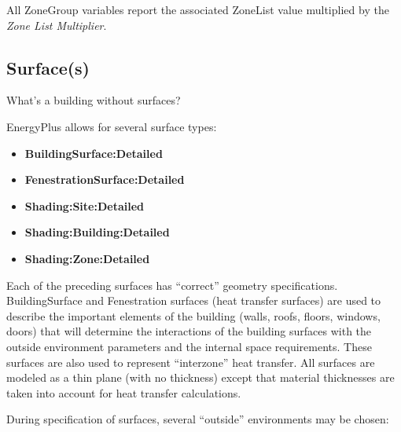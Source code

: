 All ZoneGroup variables report the associated ZoneList value multiplied by the \emph{Zone List Multiplier}.

\subsection{Surface(s)}\label{surfaces}

What's a building without surfaces?

EnergyPlus allows for several surface types:

\begin{itemize}
\item
  \textbf{BuildingSurface:Detailed}
\item
  \textbf{FenestrationSurface:Detailed}
\item
  \textbf{Shading:Site:Detailed}
\item
  \textbf{Shading:Building:Detailed}
\item
  \textbf{Shading:Zone:Detailed}
\end{itemize}

Each of the preceding surfaces has ``correct'' geometry specifications. BuildingSurface and Fenestration surfaces (heat transfer surfaces) are used to describe the important elements of the building (walls, roofs, floors, windows, doors) that will determine the interactions of the building surfaces with the outside environment parameters and the internal space requirements. These surfaces are also used to represent ``interzone'' heat transfer. All surfaces are modeled as a thin plane (with no thickness) except that material thicknesses are taken into account for heat transfer calculations.

During specification of surfaces, several ``outside'' environments may be chosen:

